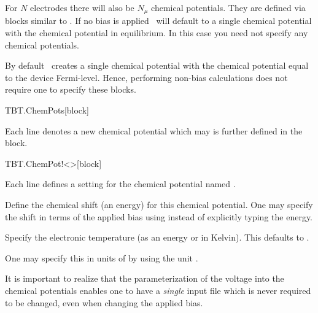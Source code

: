 For $N$ electrodes there will also be $N_\mu$ chemical
potentials. They are defined via blocks similar to .
If no bias is applied \tbtrans\ will default to a single chemical
potential with the chemical potential in equilibrium. In this case you
need not specify any chemical potentials.

By default \tbtrans\ creates a single chemical potential with the
chemical potential equal to the device Fermi-level. Hence, performing
non-bias calculations does not require one to specify these blocks.

\begin{fdfentry}{TBT.ChemPots}[block]
  
  Each line denotes a new chemical potential which may is further
  defined in the  block.
  
\end{fdfentry}

\begin{fdfentry}{TBT.ChemPot!<>}[block]

  Each line defines a setting for the chemical potential named
  \fdf*{<>}.

  \begin{fdfoptions}
    

    Define the chemical shift (an energy) for this chemical
    potential. One may specify the shift in terms of the applied bias
    using  instead of explicitly typing the energy.


    Specify the electronic temperature (as an energy or in
    Kelvin). This defaults to .

    One may specify this in units of  by
    using the unit .

  \end{fdfoptions}

  It is important to realize that the parameterization of the voltage
  into the chemical potentials enables one to have a \emph{single}
  input file which is never required to be changed, even when changing
  the applied bias.

\end{fdfentry}

